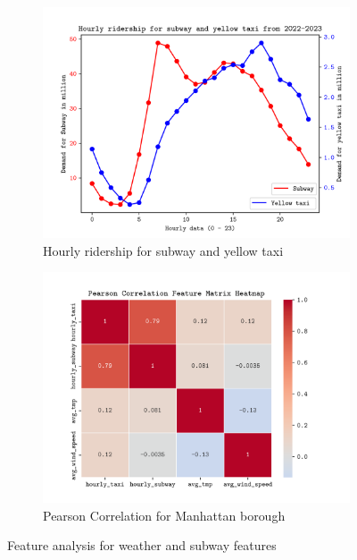 \documentclass[11pt]{article}
\begin{document}
\begin{figure}[ht]
    \centering
    \begin{subfigure}[b]{0.45\textwidth}
        \includegraphics[width=\textwidth]{plots/yellow_subway.png}
        \caption{Hourly ridership for subway and yellow taxi}
        \label{subfig:mta_taxi}
    \end{subfigure}
    \hfill
    \begin{subfigure}[b]{0.45\textwidth}
        \includegraphics[width=\textwidth]{plots/pearson_correlation.png}
        \caption{Pearson Correlation for Manhattan borough }
        \label{subfig:plot2}
    \end{subfigure}
    \caption{Feature analysis for weather and subway features}
    \label{fig:pearson correlation}
\end{figure}
\end{document}
